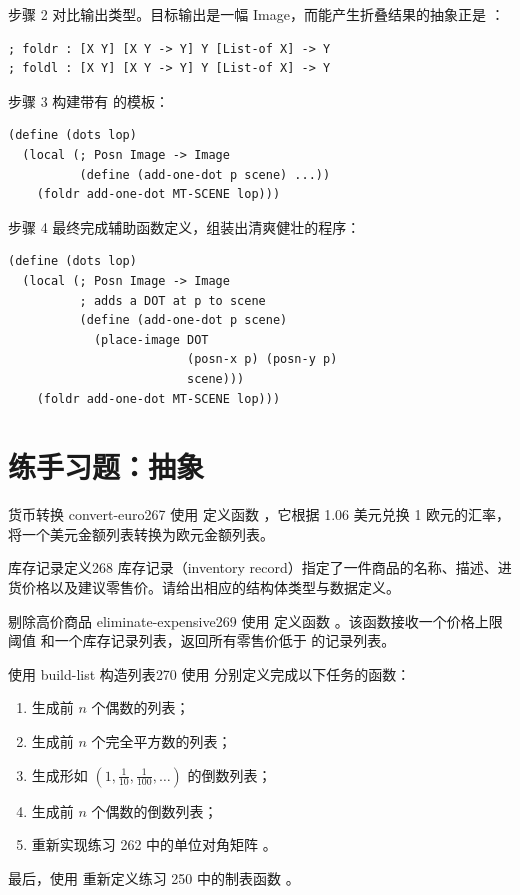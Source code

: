 步骤 2 对比输出类型。目标输出是一幅 Image，而能产生折叠结果的抽象正是 ：
\begin{lstlisting}[language=BSL]
; foldr : [X Y] [X Y -> Y] Y [List-of X] -> Y
; foldl : [X Y] [X Y -> Y] Y [List-of X] -> Y
\end{lstlisting}

步骤 3 构建带有  的模板：
\begin{lstlisting}[language=BSL]
(define (dots lop)
  (local (; Posn Image -> Image
          (define (add-one-dot p scene) ...))
    (foldr add-one-dot MT-SCENE lop)))
\end{lstlisting}

步骤 4 最终完成辅助函数定义，组装出清爽健壮的程序：
\begin{lstlisting}[language=BSL]
(define (dots lop)
  (local (; Posn Image -> Image
          ; adds a DOT at p to scene
          (define (add-one-dot p scene)
            (place-image DOT
                         (posn-x p) (posn-y p)
                         scene)))
    (foldr add-one-dot MT-SCENE lop)))
\end{lstlisting}

\section{练手习题：抽象}
\label{sec:16_7}

\begin{exercise}{货币转换 convert-euro}{267}
使用  定义函数 ，它根据 1.06 美元兑换 1 欧元的汇率，将一个美元金额列表转换为欧元金额列表。
\end{exercise}

\begin{exercise}{库存记录定义}{268}
库存记录（inventory record）指定了一件商品的名称、描述、进货价格以及建议零售价。请给出相应的结构体类型与数据定义。
\end{exercise}

\begin{exercise}{剔除高价商品 eliminate-expensive}{269}
使用  定义函数 。该函数接收一个价格上限阈值  和一个库存记录列表，返回所有零售价低于  的记录列表。
\end{exercise}

\begin{exercise}{使用 build-list 构造列表}{270}
使用  分别定义完成以下任务的函数：
\begin{enumerate}
  \item 生成前 $n$ 个偶数的列表；
  \item 生成前 $n$ 个完全平方数的列表；
  \item 生成形如 $\left(1, \frac{1}{10}, \frac{1}{100}, \dots\right)$ 的倒数列表；
  \item 生成前 $n$ 个偶数的倒数列表；
  \item 重新实现练习 262 中的单位对角矩阵 。
\end{enumerate}
最后，使用  重新定义练习 250 中的制表函数 。
\end{exercise}

